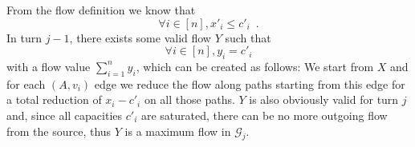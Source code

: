 \begin{proofsketch}
  From the flow definition we know that
  \begin{equation}
  \label{saturation:flowleqcap}
    \forall i \in [n], x'_i \leq c'_i \enspace.
  \end{equation}
  In turn $j-1$, there exists some valid flow $Y$ such that
  \begin{equation*}
    \forall i \in [n], y_i = c'_i
  \end{equation*}
  with a flow value $\sum\limits_{i=1}^{n}y_i$, which can be created as follows: We start from $X$ and for each
  $\left(A, v_i\right)$ edge we reduce the flow along paths starting from this edge for a total reduction of $x_i - c'_i$ on
  all those paths. $Y$ is also obviously valid for turn $j$ and, since all capacities $c'_i$ are saturated, there can
  be no more outgoing flow from the source, thus $Y$ is a maximum flow in $\mathcal{G}_j$.
\end{proofsketch}
